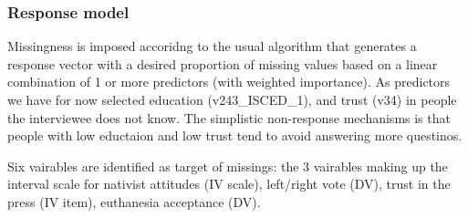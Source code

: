 \subsubsection{Response model}
Missingness is imposed accoridng to the usual algorithm that generates a response vector
with a desired proportion of missing values based on a linear combination of 1 or more
predictors (with weighted importance). As predictors we have for now selected education (v243\_ISCED\_1),
and trust (v34) in people the interviewee does not know. The simplistic non-response mechanisms 
is that people with low eductaion and low trust tend to avoid answering more questinos.

Six vairables are identified as target of missings: the 3 vairables making up the interval scale
for nativist attitudes (IV scale), left/right vote (DV), trust in the press (IV item), euthanesia 
acceptance (DV).


